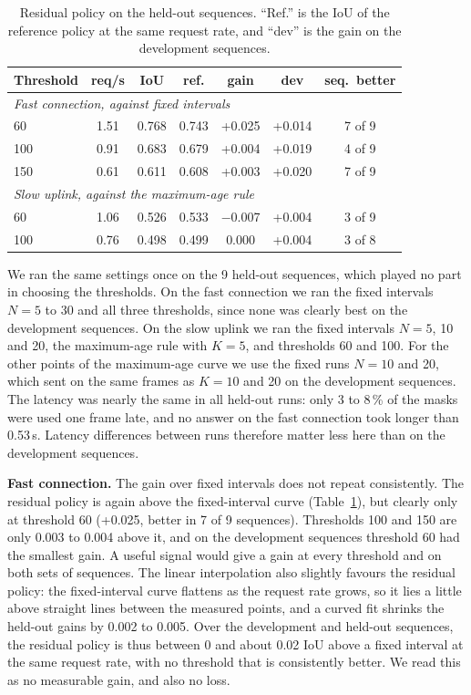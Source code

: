 \documentclass[conference]{IEEEtran}
\begin{document}
\begin{table}[t]
\centering
\caption{Residual policy on the held-out sequences. ``Ref.'' is the IoU of the reference policy at the same request rate, and ``dev'' is the gain on the development sequences.}
\label{tab:heldout}
\footnotesize
\setlength{\tabcolsep}{3pt}
\begin{tabular}{lcccccc}
\toprule
Threshold & req/s & IoU & ref. & gain & dev & seq.\ better \\
\midrule
\multicolumn{7}{l}{\emph{Fast connection, against fixed intervals}} \\
60  & 1.51 & 0.768 & 0.743 & +0.025 & +0.014 & 7 of 9 \\
100 & 0.91 & 0.683 & 0.679 & +0.004 & +0.019 & 4 of 9 \\
150 & 0.61 & 0.611 & 0.608 & +0.003 & +0.020 & 7 of 9 \\
\midrule
\multicolumn{7}{l}{\emph{Slow uplink, against the maximum-age rule}} \\
60  & 1.06 & 0.526 & 0.533 & $-$0.007 & +0.004 & 3 of 9 \\
100 & 0.76 & 0.498 & 0.499 & 0.000 & +0.004 & 3 of 8 \\
\bottomrule
\end{tabular}
\end{table}

We ran the same settings once on the 9 held-out sequences, which played no part in choosing the thresholds. On the fast connection we ran the fixed intervals $N=5$ to 30 and all three thresholds, since none was clearly best on the development sequences. On the slow uplink we ran the fixed intervals $N=5$, 10 and 20, the maximum-age rule with $K=5$, and thresholds 60 and 100. For the other points of the maximum-age curve we use the fixed runs $N=10$ and 20, which sent on the same frames as $K=10$ and 20 on the development sequences. The latency was nearly the same in all held-out runs: only 3 to 8\,\% of the masks were used one frame late, and no answer on the fast connection took longer than 0.53\,s. Latency differences between runs therefore matter less here than on the development sequences.

\textbf{Fast connection.} The gain over fixed intervals does not repeat consistently. The residual policy is again above the fixed-interval curve (Table~\ref{tab:heldout}), but clearly only at threshold 60 (+0.025, better in 7 of 9 sequences). Thresholds 100 and 150 are only 0.003 to 0.004 above it, and on the development sequences threshold 60 had the smallest gain. A useful signal would give a gain at every threshold and on both sets of sequences. The linear interpolation also slightly favours the residual policy: the fixed-interval curve flattens as the request rate grows, so it lies a little above straight lines between the measured points, and a curved fit shrinks the held-out gains by 0.002 to 0.005. Over the development and held-out sequences, the residual policy is thus between 0 and about 0.02 IoU above a fixed interval at the same request rate, with no threshold that is consistently better. We read this as no measurable gain, and also no loss.
\end{document}
